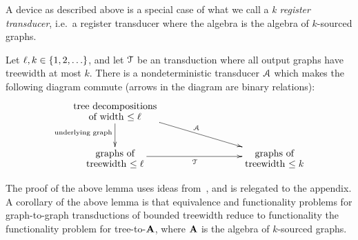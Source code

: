 A device as described above is a special case of what we call a \emph{\treetotreewidth k register transducer}, i.e.~a register transducer where the algebra is the algebra of $k$-sourced graphs.  

\begin{lemma}\label{lem:transduction-to-registers}
    Let $\ell, k \in \{1,2,\ldots\}$, and  let ${\mathcal T}$ be an \mso transduction where all output graphs have treewidth at most $k$. There is a nondeterministic  transducer ${\mathcal A}$ which makes the following diagram commute (arrows in the diagram are binary relations):
    \begin{align*}
    \xymatrix@C=3cm{
        \txt{tree decompositions\\ of width $\le \ell$}
        \ar[d]_{\txt{\scriptsize underlying graph}}
         \ar[dr]^\Aa\\
        \txt{graphs of\\ treewidth $\le \ell$}\ar[r]_\Tt &
        \txt{graphs  of\\ treewidth $\le k$} 
    }
    \end{align*}
\end{lemma}
The proof of the above lemma uses ideas from~\cite{courcelleMonadicSecondorderLogic1990,bloem_comparison_2000,alurStreamingTreeTransducers2017}, and  is relegated to the appendix.   A corollary of the above lemma is that  equivalence and functionality  problems for graph-to-graph \mso transductions of bounded treewidth  reduce to functionality the functionality problem  for tree-to-$\mathbf{A}$, where $\mathbf{A}$ is the algebra of $k$-sourced graphs.


